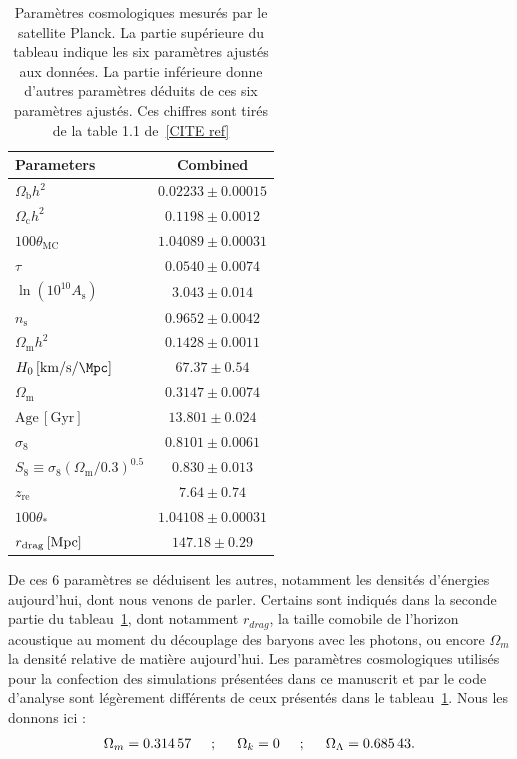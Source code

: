 \documentclass[11pt, twoside, a4paper, openright]{report}
\begin{document}
\begin{table}[h]
  \centering
  \caption{Paramètres cosmologiques mesurés par le satellite Planck. La partie supérieure du tableau indique les six paramètres ajustés aux données. La partie inférieure donne d'autres paramètres déduits de ces six paramètres ajustés. Ces chiffres sont tirés de la table 1.1 de~\ref{CITE ref}}
  \label{table:planck2018}
  \begin{tabular}{lc}
    \toprule
    Parameters & Combined \\
    \midrule
    $\Omega_{\mathrm{b}}h^2$\dotfill & $0.02233\pm0.00015$ \\
    $\Omega_{\mathrm{c}}h^2$\dotfill & $0.1198\pm0.0012$ \\
    $100\theta_{\mathrm{MC}}$\dotfill & $1.04089\pm0.00031$ \\
    $\tau$\dotfill & $0.0540\pm0.0074$ \\
    $\ln(10^{10}A_\mathrm{s})$\dotfill & $3.043\pm0.014$ \\
    $n_\mathrm{s}$\dotfill & $0.9652\pm0.0042$ \\
    \midrule
    $\Omega_{\mathrm{m}} h^2$\dotfill & $ 0.1428\pm 0.0011 $ \\
    $H_0 \,[\si{\kilo\meter\per\second\per\Mpc}]$\dotfill & $67.37\pm0.54$ \\
    $\Omega_{\mathrm{m}}$\dotfill & $0.3147\pm0.0074$ \\
    $\mathrm{Age}\, [\mathrm{Gyr}]$\dotfill  & $13.801\pm0.024$ \\
    $\sigma_8$\dotfill & $0.8101\pm0.0061$ \\
    $S_8\equiv \sigma_8 (\Omega_{\mathrm{m}}/0.3)^{0.5}$\dotfill & $0.830\pm0.013$ \\
    $z_{\mathrm{re}}$\dotfill & $7.64\pm0.74$ \\
    $100\theta_\ast$\dotfill & $1.04108\pm0.00031$ \\
    $r_{\mathrm{drag}} \,[{\rm Mpc}]$\dotfill & $147.18\pm0.29$ \\
    \bottomrule
  \end{tabular}
\end{table}

De ces 6 paramètres se déduisent les autres, notamment les densités d'énergies aujourd'hui, dont nous venons de parler. Certains sont indiqués dans la seconde partie du tableau~\ref{table:planck2018},
dont notamment $r_{drag}$, la taille comobile de l'horizon acoustique au moment du découplage des baryons avec les photons,
ou encore $\Omega_m$ la densité relative de matière aujourd'hui. Les paramètres cosmologiques utilisés pour la confection des simulations présentées dans ce manuscrit et par le code d'analyse \picca{} sont légèrement différents de ceux présentés dans le tableau~\ref{table:planck2018}. Nous les donnons ici :
\begin{equation}
  \label{eq:par_cosmo}
  \Omega_m = \num{0.31457} \hspace{0.5cm} ; \hspace{0.5cm} \Omega_k = \num{0} \hspace{0.5cm} ; \hspace{0.5cm} \Omega_{\Lambda} = \num{0.68543} .
\end{equation}
\end{document}
